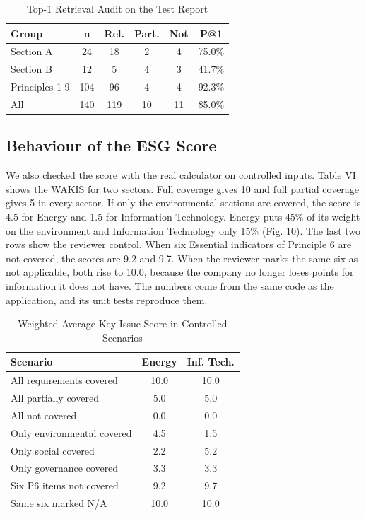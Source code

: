 \documentclass[conference]{IEEEtran}
\begin{document}
\begin{table}[!t]\centering\caption{Top-1 Retrieval Audit on the Test Report}
\footnotesize\begin{tabular}{lccccc}\toprule
Group & n & Rel. & Part. & Not & P@1 \\ \midrule
Section A & 24 & 18 & 2 & 4 & 75.0\% \\
Section B & 12 & 5 & 4 & 3 & 41.7\% \\
Principles 1-9 & 104 & 96 & 4 & 4 & 92.3\% \\
All & 140 & 119 & 10 & 11 & 85.0\% \\
\bottomrule\end{tabular}
\par{}
\end{table}
\subsection{Behaviour of the ESG Score}
We also checked the score with the real calculator on controlled inputs. Table VI shows the WAKIS for two sectors. Full coverage gives 10 and full partial coverage gives 5 in every sector. If only the environmental sections are covered, the score is 4.5 for Energy and 1.5 for Information Technology. Energy puts 45\% of its weight on the environment and Information Technology only 15\% (Fig. 10). The last two rows show the reviewer control. When six Essential indicators of Principle 6 are not covered, the scores are 9.2 and 9.7. When the reviewer marks the same six as not applicable, both rise to 10.0, because the company no longer loses points for information it does not have. The numbers come from the same code as the application, and its unit tests reproduce them.

\begin{table}[!t]\centering\caption{Weighted Average Key Issue Score in Controlled Scenarios}
\footnotesize\begin{tabular}{lcc}\toprule
Scenario & Energy & Inf. Tech. \\ \midrule
All requirements covered & 10.0 & 10.0 \\
All partially covered & 5.0 & 5.0 \\
All not covered & 0.0 & 0.0 \\
Only environmental covered & 4.5 & 1.5 \\
Only social covered & 2.2 & 5.2 \\
Only governance covered & 3.3 & 3.3 \\
Six P6 items not covered & 9.2 & 9.7 \\
Same six marked N/A & 10.0 & 10.0 \\
\bottomrule\end{tabular}
\par{}
\end{table}
\end{document}
